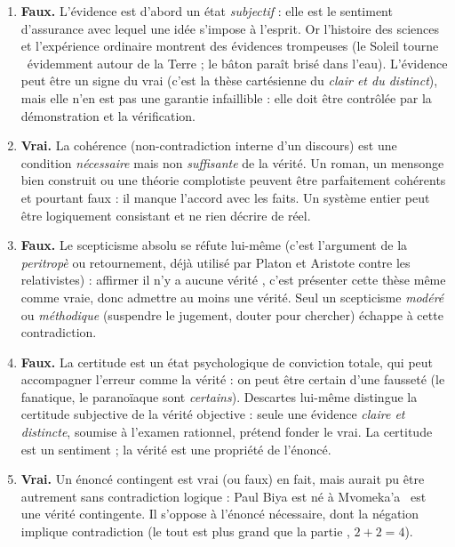 \documentclass[11pt]{article}
\newcommand{\cle}[1]{{\popxbold\color{popdark}#1}}
\begin{document}
\begin{corrige}
\begin{enumerate}
\item \textbf{Faux.} L'\cle{évidence} est d'abord un état \emph{subjectif} : elle est le sentiment d'assurance avec lequel une idée s'impose à l'esprit. Or l'histoire des sciences et l'expérience ordinaire montrent des évidences trompeuses (le Soleil \guillemotleft tourne \guillemotright\ évidemment autour de la Terre ; le bâton paraît brisé dans l'eau). L'évidence peut être un signe du vrai (c'est la thèse cartésienne du \emph{clair et du distinct}), mais elle n'en est pas une garantie infaillible : elle doit être contrôlée par la démonstration et la vérification.
\item \textbf{Vrai.} La \cle{cohérence} (non-contradiction interne d'un discours) est une condition \emph{nécessaire} mais non \emph{suffisante} de la vérité. Un roman, un mensonge bien construit ou une théorie complotiste peuvent être parfaitement cohérents et pourtant faux : il manque l'accord avec les faits. Un système entier peut être logiquement consistant et ne rien décrire de réel.
\item \textbf{Faux.} Le \cle{scepticisme} absolu se réfute lui-même (c'est l'argument de la \emph{peritropè} ou retournement, déjà utilisé par Platon et Aristote contre les relativistes) : affirmer \guillemotleft il n'y a aucune vérité \guillemotright, c'est présenter cette thèse même comme vraie, donc admettre au moins une vérité. Seul un scepticisme \emph{modéré} ou \emph{méthodique} (suspendre le jugement, douter pour chercher) échappe à cette contradiction.
\item \textbf{Faux.} La \cle{certitude} est un état psychologique de conviction totale, qui peut accompagner l'erreur comme la vérité : on peut être certain d'une fausseté (le fanatique, le paranoïaque sont \emph{certains}). Descartes lui-même distingue la certitude subjective de la vérité objective : seule une évidence \emph{claire et distincte}, soumise à l'examen rationnel, prétend fonder le vrai. La certitude est un sentiment ; la vérité est une propriété de l'énoncé.
\item \textbf{Vrai.} Un énoncé \cle{contingent} est vrai (ou faux) en fait, mais aurait pu être autrement sans contradiction logique : \guillemotleft Paul Biya est né à Mvomeka'a \guillemotright\ est une vérité contingente. Il s'oppose à l'énoncé \cle{nécessaire}, dont la négation implique contradiction (\guillemotleft le tout est plus grand que la partie \guillemotright, $2+2=4$).
\end{enumerate}
\end{corrige}
\end{document}
